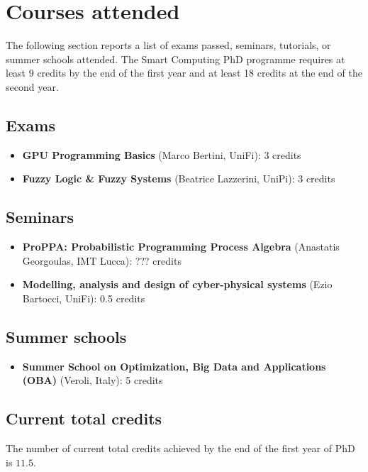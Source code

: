
\section*{Courses attended}
  The following section reports a list of exams passed, seminars, tutorials, or summer schools attended. The Smart Computing PhD programme requires at least 9 credits by the end of the first year and at least 18 credits at the end of the second year.

  \subsection*{Exams}
  
    \begin{itemize}
      \item \textbf{GPU Programming Basics} (Marco Bertini, UniFi): 3 credits
      \item \textbf{Fuzzy Logic \& Fuzzy Systems} (Beatrice Lazzerini, UniPi): 3 credits
    \end{itemize}
    
  \subsection*{Seminars}
  
    \begin{itemize}
      \item \textbf{ProPPA: Probabilistic Programming Process Algebra} (Anastatis Georgoulas, IMT Lucca): ??? credits
      \item \textbf{Modelling, analysis and design of cyber-physical systems} (Ezio Bartocci, UniFi): 0.5 credits
    \end{itemize}
    
  \subsection*{Summer schools}
  
    \begin{itemize}
      \item \textbf{Summer School on Optimization, Big Data and Applications (OBA)} (Veroli, Italy): 5 credits
    \end{itemize}
    
  \subsection*{Current total credits}
  
    The number of current total credits achieved by the end of the first year of PhD is $11.5$.
    
\newpage
  